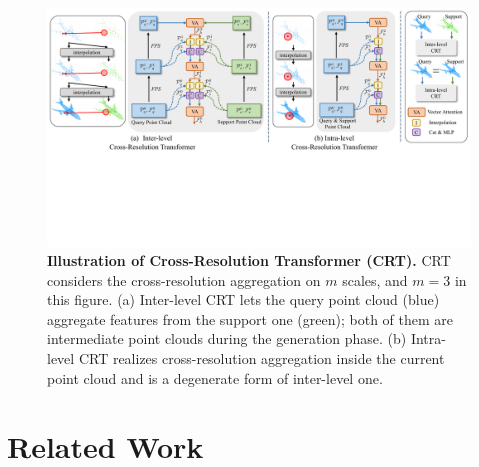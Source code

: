 \documentclass[letterpaper]{article} %
\begin{document}
\begin{figure}[t]
\begin{center}
\includegraphics[width=1.0\linewidth]{Figures/crt.pdf}
\end{center}
\caption{
{\bf Illustration of Cross-Resolution Transformer (CRT).} 
CRT considers the cross-resolution aggregation on $m$ scales, and $m=3$ in this figure. 
(a) Inter-level CRT lets the query point cloud (blue) aggregate features from the support one (green); both of them are intermediate point clouds during the generation phase. 
(b) Intra-level CRT realizes cross-resolution aggregation inside the current point cloud and is a degenerate form of inter-level one.}
\label{fig:crt}
\end{figure}



\section{Related Work} \label{sec:rw}
\end{document}
